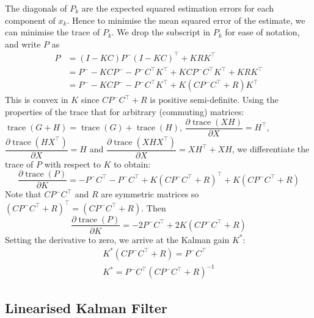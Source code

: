 \documentclass[11pt]{report} %
\begin{document}
The diagonals of $P_{k}$ are the expected squared estimation errors for each component of $x_{k}$. Hence to minimise the mean squared error of the estimate, we can minimise the trace of $P_{k}$. We drop the subscript in $P_{k}$ for ease of notation, and write $P$ as
\begin{align}
P &= \left(I - KC\right)P^{-}\left(I - KC\right)^{\top} + KRK^{\top} \\
&= P^{-} - KCP^{-} - P^{-}C^{\top}K^{\top} + KCP^{-}C^{\top}K^{\top} + KRK^{\top} \\
&= P^{-} - KCP^{-} - P^{-}C^{\top}K^{\top} + K\left(CP^{-}C^{\top} + R\right)K^{\top}
\end{align}
This is convex in $K$ since $CP^{-}C^{\top} + R$ is positive semi-definite. Using the properties of the trace that for arbitrary (commuting) matrices: $\operatorname{trace}\left(G + H\right) = \operatorname{trace}\left(G\right) + \operatorname{trace}\left(H\right)$, $\dfrac{\partial \operatorname{trace}\left(XH\right)}{\partial X} = H^{\top}$, $\dfrac{\partial \operatorname{trace}\left(HX^{\top}\right)}{\partial X} = H$ and $\dfrac{\partial \operatorname{trace}\left(XHX^{\top}\right)}{\partial X} = XH^{\top} + XH$, we differentiate the trace of $P$ with respect to $K$ to obtain:
\begin{equation}
\dfrac{\partial \operatorname{trace}\left(P\right)}{\partial K} = -P^{-}C^{\top} - P^{-}C^{\top} + K\left(CP^{-}C^{\top} + R\right)^{\top} + K\left(CP^{-}C^{\top} + R\right)
\end{equation}
Note that $CP^{-}C^{\top}$ and $R$ are symmetric matrices so $\left(CP^{-}C^{\top} + R\right)^{\top} = \left(CP^{-}C^{\top} + R\right)$. Then
\begin{equation}
\dfrac{\partial \operatorname{trace}\left(P\right)}{\partial K} = -2P^{-}C^{\top} + 2K\left(CP^{-}C^{\top} + R\right)
\end{equation}
Setting the derivative to zero, we arrive at the Kalman gain $K^{*}$:
\begin{gather}
K^{*}\left(CP^{-}C^{\top} + R\right) = P^{-}C^{\top} \\
K^{*} = P^{-}C^{\top}\left(CP^{-}C^{\top} + R\right)^{-1}
\end{gather}

\subsection{Linearised Kalman Filter}
\end{document}
